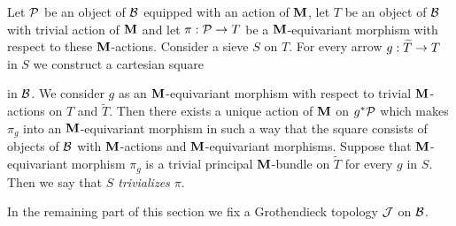 \begin{definition}
Let ${\mathcal P}$ be an object of ${\mathcal B}$ equipped with an action of $\mathbf{M}$, let $T$ be an object of ${\mathcal B}$ with trivial action of $\mathbf{M}$ and let $\pi:{\mathcal P}\rightarrow T$ be a $\mathbf{M}$-equivariant morphism with respect to these $\mathbf{M}$-actions. Consider a sieve $S$ on $T$. For every arrow $g:\widetilde{T}\rightarrow T$ in $S$ we construct a cartesian square
\begin{center}
\end{center}
in ${\mathcal B}$. We consider $g$ as an $\mathbf{M}$-equivariant morphism with respect to trivial $\mathbf{M}$-actions on $T$ and $\widetilde{T}$. Then there exists a unique action of $\mathbf{M}$ on $g^*{\mathcal P}$ which makes $\pi_g$ into an $\mathbf{M}$-equivariant morphism in such a way that the square consists of objects of ${\mathcal B}$ with $\mathbf{M}$-actions and $\mathbf{M}$-equivariant morphisms. Suppose that $\mathbf{M}$-equivariant morphism $\pi_g$ is a trivial principal $\mathbf{M}$-bundle on $\widetilde{T}$ for every $g$ in $S$. Then we say that \textit{$S$ trivializes $\pi$}.
\end{definition}
\noindent
In the remaining part of this section we fix a Grothendieck topology ${\mathcal J}$ on ${\mathcal B}$.

